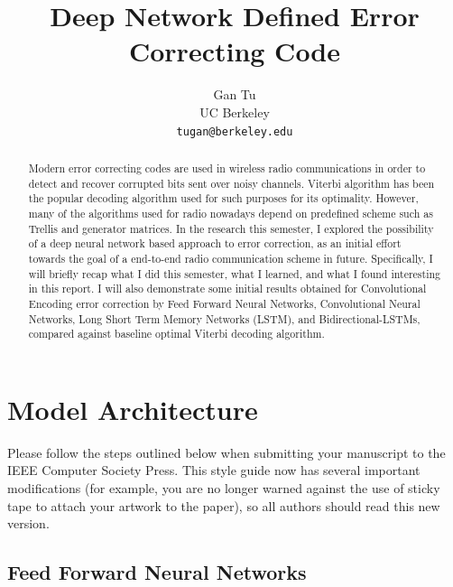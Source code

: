 \documentclass[10pt,twocolumn,letterpaper]{article}
\begin{document}
\title{Deep Network Defined Error Correcting Code}

\author{Gan Tu\\
UC Berkeley\\
{\tt\small tugan@berkeley.edu}
}

\maketitle

\begin{abstract}
   Modern error correcting codes are used in wireless radio communications in order to detect and recover corrupted bits sent over noisy channels. Viterbi algorithm has been the popular decoding algorithm used for such purposes for its optimality. However, many of the algorithms used for radio nowadays depend on predefined scheme such as Trellis and generator matrices. In the research this semester, I explored the possibility of a deep neural network based approach to error correction, as an initial effort towards the goal of a end-to-end radio communication scheme in future. Specifically, I will briefly recap what I did this semester, what I learned, and what I found interesting in this report. I will also demonstrate some initial results obtained for Convolutional Encoding error correction by Feed Forward Neural Networks, Convolutional Neural Networks, Long Short Term Memory Networks (LSTM), and Bidirectional-LSTMs, compared against baseline optimal Viterbi decoding algorithm.
\end{abstract}

\section{Model Architecture}

Please follow the steps outlined below when submitting your manuscript to
the IEEE Computer Society Press.  This style guide now has several
important modifications (for example, you are no longer warned against the
use of sticky tape to attach your artwork to the paper), so all authors
should read this new version.

\subsection{Feed Forward Neural Networks}
\end{document}
